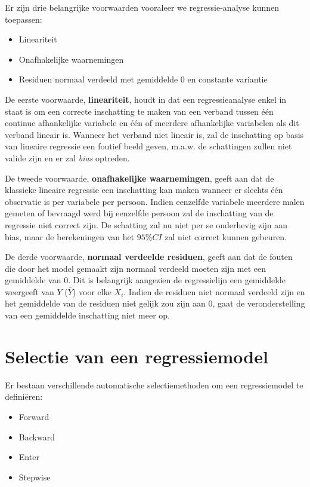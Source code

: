 \documentclass[
]{book}
\providecommand{\tightlist}{%
  \setlength{\itemsep}{0pt}\setlength{\parskip}{0pt}}
\theoremstyle{definition}
\theoremstyle{definition}
\theoremstyle{definition}
\theoremstyle{definition}
\theoremstyle{remark}
\begin{document}
Er zijn drie belangrijke voorwaarden vooraleer we regressie-analyse kunnen toepassen:

\begin{itemize}
\tightlist
\item
  Lineariteit
\item
  Onafhakelijke waarnemingen
\item
  Residuen normaal verdeeld met gemiddelde 0 en constante variantie
\end{itemize}

De eerste voorwaarde, \textbf{lineariteit}, houdt in dat een regressieanalyse enkel in staat is om een correcte inschatting te maken van een verband tussen één continue afhankelijke variabele en één of meerdere afhankelijke variabelen als dit verband lineair is. Wanneer het verband niet lineair is, zal de inschatting op basis van lineaire regressie een foutief beeld geven, m.a.w. de schattingen zullen niet valide zijn en er zal \emph{bias} optreden.

De tweede voorwaarde, \textbf{onafhakelijke waarnemingen}, geeft aan dat de klassieke lineaire regressie een inschatting kan maken wanneer er slechts één observatie is per variabele per persoon. Indien eenzelfde variabele meerdere malen gemeten of bevraagd werd bij eenzelfde persoon zal de inschatting van de regressie niet correct zijn. De schatting zal nu niet per se onderhevig zijn aan bias, maar de berekeningen van het \(95\% CI\) zal niet correct kunnen gebeuren.

De derde voorwaarde, \textbf{normaal verdeelde residuen}, geeft aan dat de fouten die door het model gemaakt zijn normaal verdeeld moeten zijn met een gemiddelde van 0. Dit is belangrijk aangezien de regressielijn een gemiddelde weergeeft van \(Y\) (\(\bar{Y}\)) voor elke \(X_i\). Indien de residuen niet normaal verdeeld zijn en het gemiddelde van de residuen niet gelijk zou zijn aan 0, gaat de veronderstelling van een gemiddelde inschatting niet meer op.

\hypertarget{selectie-van-een-regressiemodel}{%
\section*{Selectie van een regressiemodel}\label{selectie-van-een-regressiemodel}}


Er bestaan verschillende automatische selectiemethoden om een regressiemodel te definiëren:

\begin{itemize}
\tightlist
\item
  Forward
\item
  Backward
\item
  Enter
\item
  Stepwise
\end{itemize}
\end{document}
